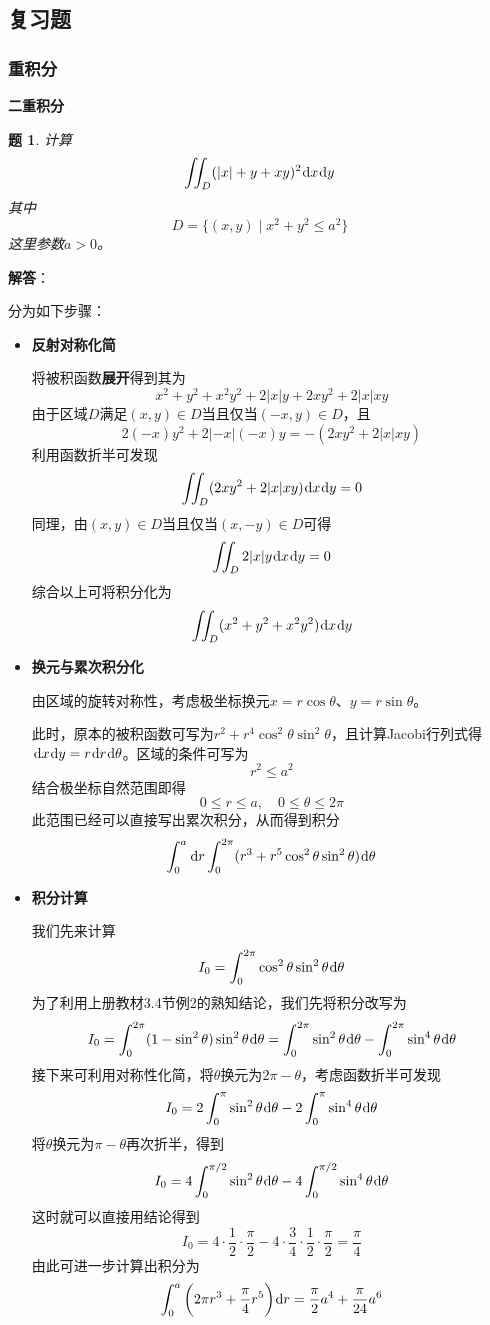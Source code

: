 \documentclass[a4paper,UTF8,fontset=windows,AutoFakeBold]{ctexart}
\newcommand*{\dr}{\hspace{0.07em}\mathrm{d}}
\theoremstyle{ex}
\newtheorem{exercise}{题}
\newcommand{\sol}[1]{{\vspace{5pt}\kaishu\noindent\textbf{解答}：\vspace{-3pt}
\begin{compactitem}
    \item[] #1
\end{compactitem}
}}
\begin{document}
\subsection{复习题}
\subsubsection{重积分}
\noindent\textbf{二重积分}
\begin{framed}
\begin{exercise}\label{sin 2 and 4 to 2pi}
    计算
    $$\iint_D(|x|+y+xy)^2\dr x\dr y$$
    其中
    $$D=\{(x,y)\mid x^2+y^2\le a^2\}$$
    这里参数$a>0$。
\end{exercise}
\sol{
    分为如下步骤：
    \begin{itemize}
        \item \textbf{反射对称化简}
        
        将被积函数\textbf{展开}得到其为
        $$x^2+y^2+x^2y^2+2|x|y+2xy^2+2|x|xy$$
        由于区域$D$满足$(x,y)\in D$当且仅当$(-x,y)\in D$，且
        $$2(-x)y^2+2|-x|(-x)y=-(2xy^2+2|x|xy)$$
        利用函数折半可发现
        $$\iint_D(2xy^2+2|x|xy)\dr x\dr y=0$$
        同理，由$(x,y)\in D$当且仅当$(x,-y)\in D$可得
        $$\iint_D2|x|y\dr x\dr y=0$$
        综合以上可将积分化为
        $$\iint_D(x^2+y^2+x^2y^2)\dr x\dr y$$

        \item \textbf{换元与累次积分化}
        
        由区域的旋转对称性，考虑极坐标换元$x=r\cos\theta$、$y=r\sin\theta$。

        此时，原本的被积函数可写为$r^2+r^4\cos^2\theta\sin^2\theta$，且计算Jacobi行列式得$\dr x\dr y=r\dr r\dr\theta$。区域的条件可写为
        $$r^2\le a^2$$
        结合极坐标自然范围即得
        $$0\le r\le a,\quad 0\le\theta\le2\pi$$
        此范围已经可以直接写出累次积分，从而得到积分
        $$\int_0^a\dr r\int_0^{2\pi}(r^3+r^5\cos^2\theta\sin^2\theta)\dr\theta$$

        \item \textbf{积分计算}
        
        我们先来计算
        $$I_0=\int_0^{2\pi}\cos^2\theta\sin^2\theta\dr\theta$$
        为了利用上册教材3.4节例2的熟知结论，我们先将积分改写为
        $$I_0=\int_0^{2\pi}(1-\sin^2\theta)\sin^2\theta\dr\theta=\int_0^{2\pi}\sin^2\theta\dr\theta-\int_0^{2\pi}\sin^4\theta\dr\theta$$
        接下来可利用对称性化简，将$\theta$换元为$2\pi-\theta$，考虑函数折半可发现
        $$I_0=2\int_0^\pi\sin^2\theta\dr\theta-2\int_0^\pi\sin^4\theta\dr\theta$$
        将$\theta$换元为$\pi-\theta$再次折半，得到
        $$I_0=4\int_0^{\pi/2}\sin^2\theta\dr\theta-4\int_0^{\pi/2}\sin^4\theta\dr\theta$$
        这时就可以直接用结论得到
        $$I_0=4\cdot\frac{1}{2}\cdot\frac{\pi}{2}-4\cdot\frac{3}{4}\cdot\frac{1}{2}\cdot\frac{\pi}{2}=\frac{\pi}{4}$$
        由此可进一步计算出积分为
        $$\int_0^a\bigg(2\pi r^3+\frac{\pi}{4}r^5\bigg)\dr r=\frac{\pi}{2}a^4+\frac{\pi}{24}a^6$$
    \end{itemize}
}
\end{framed}
\end{document}
